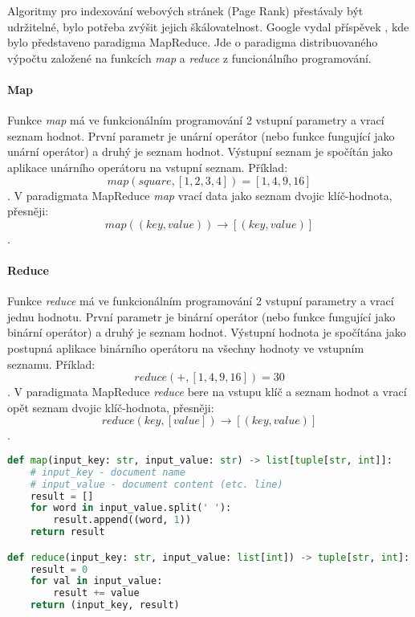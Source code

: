 Algoritmy pro indexování webových stránek (Page Rank) přestávaly být udržitelné, bylo potřeba zvýšit jejich škálovatelnost. Google vydal příspěvek , kde bylo představeno paradigma MapReduce. Jde o paradigma distribuovaného výpočtu založené na funkcích \textit{map} a \textit{reduce} z funcionálního programování.

\paragraph*{Map} Funkce \textit{map} má ve funkcionálním programování 2 vstupní parametry a vrací seznam hodnot. První parametr je unární operátor (nebo funkce fungující jako unární operátor) a druhý je seznam hodnot. Výstupní seznam je spočítán jako aplikace unárního operátoru na vstupní seznam. Příklad:
$$
map(square, [1, 2, 3, 4]) = [1, 4, 9, 16]
$$.
V paradigmata MapReduce \textit{map} vrací data jako seznam dvojic klíč-hodnota, přesněji: $$
map((key, value)) \rightarrow [(key, value)]
$$.

\paragraph*{Reduce} Funkce \textit{reduce} má ve funkcionálním programování 2 vstupní parametry a vrací jednu hodnotu. První parametr je binární operátor (nebo funkce fungující jako binární operátor) a druhý je seznam hodnot. Výstupní hodnota je spočítána jako postupná aplikace binárního operátoru na všechny hodnoty ve vstupním seznamu. Příklad:
$$
reduce(+, [1, 4, 9, 16]) = 30
$$.
V paradigmata MapReduce \textit{reduce} bere na vstupu klíč a seznam hodnot a vrací opět seznam dvojic klíč-hodnota, přesněji: $$
reduce(key, [value]) \rightarrow [(key, value)]
$$.

\bigskip\noindent\begin{minipage}{\linewidth}
\begin{lstlisting}[language=Python, caption={Příklad implementace funkcí \textit{map} a \textit{reduce} v paradigmatu MapReduce pro počítání četnosti slov ve vstupu v Pythonu.}]
def map(input_key: str, input_value: str) -> list[tuple[str, int]]:
    # input_key - document name
    # input_value - document content (etc. line)
    result = []
    for word in input_value.split(' '):
        result.append((word, 1))
    return result

def reduce(input_key: str, input_value: list[int]) -> tuple[str, int]:
    result = 0
    for val in input_value:
        result += value
    return (input_key, result)
\end{lstlisting}
\end{minipage}

